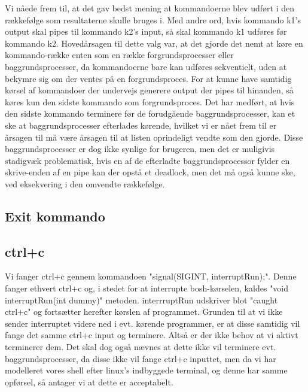 Vi nåede frem til, at det gav bedst mening at kommandoerne blev udført i den rækkefølge som resultaterne skulle bruges i.
Med andre ord, hvis kommando k1's output skal pipes til kommando k2's input, så skal kommando k1 udføres før kommando k2.
Hovedårsagen til dette valg var, at det gjorde det nemt at køre en kommando-række enten som en række forgrundsprocesser eller baggrundsprocesser, da kommandoerne bare kan udføres sekventielt, uden at bekymre sig om der ventes på en forgrundsproces. For at kunne have samtidig kørsel af kommandoer der undervejs generere output der pipes til hinanden, så køres kun den sidste kommando som forgrundsproces. Det har medført, at hvis den sidste kommando terminere før de forudgående baggrundsprocesser, kan et ske at baggrundsprocesser efterlades kørende, hvilket vi er nået frem til er årsagen til må være årsagen til at listen oprindeligt vendte som den gjorde. Disse baggrundsprocesser er dog ikke synlige for brugeren, men det er muligivis stadigvæk problematisk, hvis en af de efterladte baggrundsprocessor fylder en skrive-enden af en pipe kan der opstå et deadlock, men det må også kunne ske, ved eksekvering i den omvendte rækkefølge.

\subsection{Exit kommando}
 
\subsection{ctrl+c}
Vi fanger ctrl+c gennem kommandoen "signal(SIGINT, interruptRun);". Denne fanger ethvert ctrl+c og, i stedet for at interrupte bosh-kørselen, kaldes "void interruptRun(int dummy)" metoden. interrruptRun udskriver blot "caught ctrl+c" og fortsætter herefter kørslen af programmet. Grunden til at vi ikke sender interruptet videre ned i evt. kørende programmer, er at disse samtidig vil fange det samme ctrl+c input og terminere. Altså er der ikke behov at vi aktivt terminerer dem. Det skal dog også nævnes at dette ikke vil terminere evt. baggrundsprocesser, da disse ikke vil fange ctrl+c inputtet, men da vi har modelleret vores shell efter linux's indbyggede terminal, og denne har samme opførsel, så antager vi at dette er acceptabelt. 

